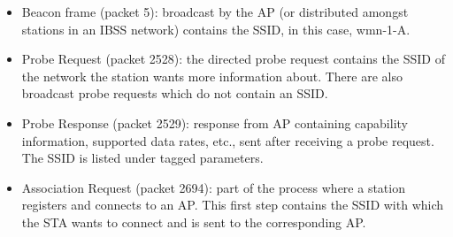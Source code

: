 \begin{itemize}
\item Beacon frame (packet 5): broadcast by the AP (or distributed amongst stations in an IBSS network) contains the SSID, in this case, wmn-1-A.
\item Probe Request (packet 2528): the directed probe request contains the SSID of the network the station wants more information about. There are also broadcast probe requests which do not contain an SSID.
\item Probe Response (packet 2529): response from AP containing capability information, supported data rates, etc., sent after receiving a probe request. The SSID is listed under tagged parameters.
\item Association Request (packet 2694): part of the process where a station registers and connects to an AP. This first step contains the SSID with which the STA wants to connect and is sent to the corresponding AP.
\end{itemize}
